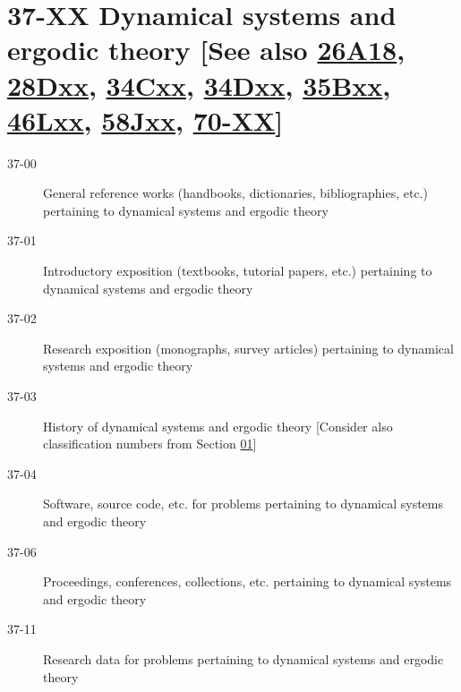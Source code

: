 \section*{37-XX Dynamical systems and ergodic theory [See also \hyperref[26A18]{26A18}, \hyperref[28Dxx]{28Dxx}, \hyperref[34Cxx]{34Cxx}, \hyperref[34Dxx]{34Dxx}, \hyperref[35Bxx]{35Bxx}, \hyperref[46Lxx]{46Lxx}, \hyperref[58Jxx]{58Jxx}, \hyperref[70-XX]{70-XX}] }\label{37-XX}
\begin{description}
\item [37-00]\label{37-00} General reference works (handbooks, dictionaries, bibliographies, etc.) pertaining to dynamical systems and ergodic theory
\item [37-01]\label{37-01} Introductory exposition (textbooks, tutorial papers, etc.) pertaining to dynamical systems and ergodic theory
\item [37-02]\label{37-02} Research exposition (monographs, survey articles) pertaining to dynamical systems and ergodic theory
\item [37-03]\label{37-03} History of dynamical systems and ergodic theory [Consider also classification numbers from Section \hyperref[01-XX]{01}]
\item [37-04]\label{37-04} Software, source code, etc. for problems pertaining to dynamical systems and ergodic theory
\item [37-06]\label{37-06} Proceedings, conferences, collections, etc. pertaining to dynamical systems and ergodic theory
\item [37-11]\label{37-11} Research data for problems pertaining to dynamical systems and ergodic theory
\end{description}

